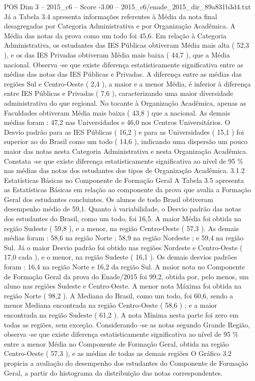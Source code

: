 \begin{textsample}{POS Dim 3 – 2015\_c6 – Score -3.00 – 2015\_c6/enade\_2015\_dir\_89a831b3d4.txt}
Já a Tabela 3.4 apresenta informações referentes à Média da nota final desagregadas por Categoria Administrativa e por Organização Acadêmica.
A Média das notas da prova como um todo foi 45,6.
Em relação à Categoria Administrativa, os estudantes das IES Públicas obtiveram Média mais alta ( 52,3 ), e os das IES Privadas obtiveram Média mais baixa ( 44,7 ), que a Média nacional.
Observa -se que existe diferença estatisticamente significativa entre as médias das notas das IES Públicas e Privadas.
A diferença entre as médias das regiões Sul e Centro-Oeste ( 2,4 ), a maior e a menor Média, é inferior à diferença entre IES Públicas e Privadas ( 7,6 ), caracterizando uma maior diversidade administrativa do que regional.
No tocante à Organização Acadêmica, apenas as Faculdades obtiveram Média mais baixa ( 43,8 ) que a nacional.
As demais médias foram : 47,2 nas Universidades e 46,0 nos Centros Universitários.
O Desvio padrão para as IES Públicas ( 16,2 ) e para as Universidades ( 15,1 ) foi superior ao do Brasil como um todo ( 14,6 ), indicando uma dispersão um pouco maior das notas nesta Categoria Administrativa e nesta Organização Acadêmica.
Constata -se que existe diferença estatisticamente significativa ao nível de 95 \% nas médias das notas dos estudantes dos tipos de Organização Acadêmica. 3.1.2 Estatísticas Básicas no Componente de Formação Geral A Tabela 3.5 apresenta as Estatísticas Básicas em relação ao componente da prova que avalia a Formação Geral dos estudantes concluintes.
Os alunos de todo Brasil obtiveram desempenho médio de 59,1.
Quanto à variabilidade, o Desvio padrão das notas dos estudantes do Brasil, como um todo, foi 16,5.
A maior Média foi obtida na região Sudeste ( 59,8 ), e a menor, na região Centro-Oeste ( 57,3 ).
As demais médias foram : 58,6 na região Norte ; 58,9 na região Nordeste ; e 59,4 na região Sul.
Já o maior Desvio padrão foi obtido nas regiões Nordeste e Centro-Oeste ( 17,0 cada ), e o menor, na região Sudeste ( 16,1 ).
Os demais desvios padrões foram : 16,4 na região Norte e 16,2 da região Sul.
A maior nota no Componente de Formação Geral da prova do Enade/2015 foi 99,2, obtida por, pelo menos, um aluno nas regiões Sudeste e Centro-Oeste.
A menor nota Máxima foi obtida na região Norte ( 98,2 ).
A Mediana do Brasil, como um todo, foi 60,6, sendo a menor Mediana encontrada na região Centro-Oeste ( 58,6 ) ; e a maior encontrada na região Sudeste ( 61,2 ).
A nota Mínima nesta parte foi zero em todas as regiões, sem exceção.
Considerando -se as notas segundo Grande Região, observa -se que existe diferença estatisticamente significativa ao nível de 95 \% entre a menor Média no Componente de Formação Geral, obtida na região Centro-Oeste ( 57,3 ), e as médias de todas as demais regiões O Gráfico 3.2 propicia a avaliação do desempenho dos estudantes do Componente de Formação Geral, a partir do histograma da distribuição das notas correspondentes.

\end{textsample}
